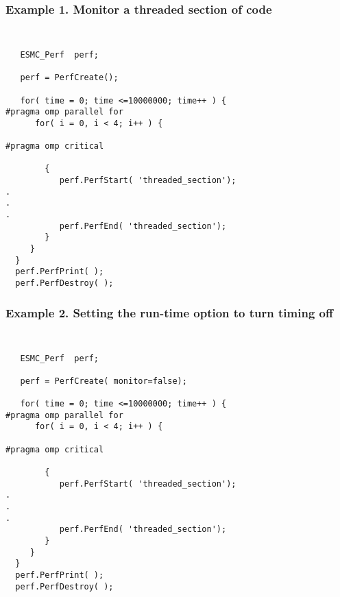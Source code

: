 %



\subsubsection{Example 1. Monitor a threaded section of code}
{\tt
\begin{verbatim}
   ESMC_Perf  perf;

   perf = PerfCreate();

   for( time = 0; time <=10000000; time++ ) {
#pragma omp parallel for
      for( i = 0, i < 4; i++ ) {

#pragma omp critical

        {
           perf.PerfStart( 'threaded_section');
.
.
.
           perf.PerfEnd( 'threaded_section');
        }
     }
  }
  perf.PerfPrint( );
  perf.PerfDestroy( );
\end{verbatim}
}
\subsubsection{Example 2. Setting the run-time option to turn timing off}
{\tt
\begin{verbatim}
   ESMC_Perf  perf;

   perf = PerfCreate( monitor=false);

   for( time = 0; time <=10000000; time++ ) {
#pragma omp parallel for
      for( i = 0, i < 4; i++ ) {

#pragma omp critical

        {
           perf.PerfStart( 'threaded_section');
.
.
.
           perf.PerfEnd( 'threaded_section');
        }
     }
  }
  perf.PerfPrint( );
  perf.PerfDestroy( );
\end{verbatim}
}
